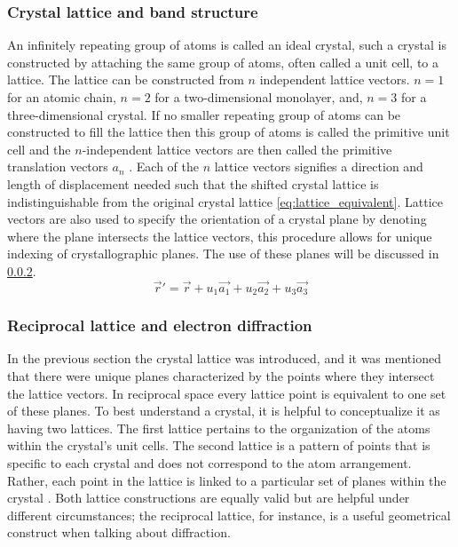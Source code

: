 \subsubsection{Crystal lattice and band structure}
An infinitely repeating group of atoms is called an ideal crystal, such a crystal is constructed by attaching the same group of atoms, often called a unit cell, to a lattice.
The lattice can be constructed from $n$ independent lattice vectors. $n=1$ for an atomic chain, $n=2$ for a two-dimensional monolayer, and, $n=3$ for a three-dimensional crystal.
If no smaller repeating group of atoms can be constructed to fill the lattice then this group of atoms is called the primitive unit cell and the $n$-independent lattice vectors are then called the primitive translation vectors $a_{n}$ \cite{Kittel1995-qt}.
Each of the $n$ lattice vectors signifies a direction and length of displacement needed such that the shifted crystal lattice is indistinguishable from the original crystal lattice \ref{eq:lattice_equivalent}.
Lattice vectors are also used to specify the orientation of a crystal plane by denoting where the plane intersects the lattice vectors, this procedure allows for unique indexing of crystallographic planes. The use of these planes will be discussed in \ref{sec:diffraction}.
\begin{equation}
    \vec{r}' = \vec{r} + u_1 \vec{a_1} +u_2 \vec{a_2} + u_3 \vec{a_3}
    \label{eq:lattice_equivalent}
\end{equation}

\subsubsection{Reciprocal lattice and electron diffraction}
\label{sec:diffraction}
In the previous section the crystal lattice was introduced, and it was mentioned that there were unique planes characterized by the points where they intersect the lattice vectors.
In reciprocal space every lattice point is equivalent to one set of these planes.
To best understand a crystal, it is helpful to conceptualize it as having two lattices. The first lattice pertains to the organization of the atoms within the crystal's unit cells. The second lattice is a pattern of points that is specific to each crystal and does not correspond to the atom arrangement. Rather, each point in the lattice is linked to a particular set of planes within the crystal \cite{Williams2009-ww}.
Both lattice constructions are equally valid but are helpful under different circumstances; the reciprocal lattice, for instance, is a useful geometrical construct when talking about diffraction.

